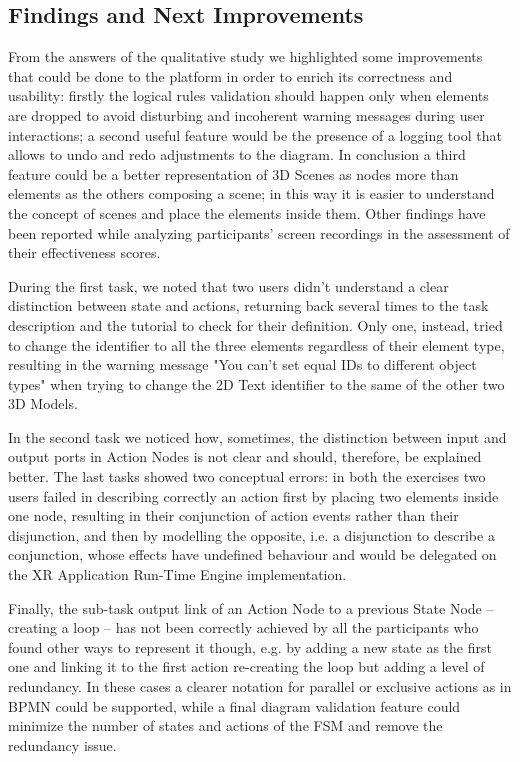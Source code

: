 \subsection{Findings and Next Improvements}
From the answers of the qualitative study we highlighted some improvements that could be done to the platform in order to enrich its correctness and usability: firstly the logical rules validation should happen only when elements are dropped to avoid disturbing and incoherent warning messages during user interactions; a second useful feature would be the presence of a logging tool that allows to undo and redo adjustments to the diagram. In conclusion a third feature could be a better representation of 3D Scenes as nodes more than elements as the others composing a scene; in this way it is easier to understand the concept of scenes and place the elements inside them.
Other findings have been reported while analyzing participants' screen recordings in the assessment of their effectiveness scores.

During the first task, we noted that two users didn't understand a clear distinction between state and actions, returning back several times to the task description and the tutorial to check for their definition. Only one, instead, tried to change the identifier to all the three elements regardless of their element type, resulting in the warning message "You can't set equal IDs to different object types" when trying to change the 2D Text identifier to the same of the other two 3D Models.

In the second task we noticed how, sometimes, the distinction between input and output ports in Action Nodes is not clear and should, therefore, be explained better. The last tasks showed two conceptual errors: in both the exercises two users failed in describing correctly an action first by placing two elements inside one node, resulting in their conjunction of action events rather than their disjunction, and then by modelling the opposite, i.e. a disjunction to describe a conjunction, whose effects have undefined behaviour and would be delegated on the XR Application Run-Time Engine implementation.

Finally, the sub-task output link of an Action Node to a previous State Node -- creating a loop -- has not been correctly achieved by all the participants who found other ways to represent it though, e.g. by adding a new state as the first one and linking it to the first action re-creating the loop but adding a level of redundancy. In these cases a clearer notation for parallel or exclusive actions as in BPMN could be supported, while a final diagram validation feature could minimize the number of states and actions of the \gls{FSM} and remove the redundancy issue.